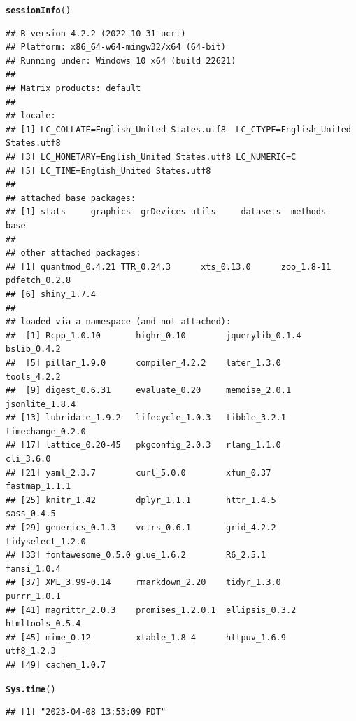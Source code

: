 \documentclass{article}\usepackage[]{graphicx}\usepackage[]{xcolor}
\makeatletter
\newcommand{\hlstd}[1]{\textcolor[rgb]{0.345,0.345,0.345}{#1}}%
\newcommand{\hlkwd}[1]{\textcolor[rgb]{0.737,0.353,0.396}{\textbf{#1}}}%
\newenvironment{kframe}{%
 \def\at@end@of@kframe{}%
 \ifinner\ifhmode%
  \def\at@end@of@kframe{\end{minipage}}%
  \begin{minipage}{\columnwidth}%
 \fi\fi%
 \def\FrameCommand##1{\hskip\@totalleftmargin \hskip-\fboxsep
 \colorbox{shadecolor}{##1}\hskip-\fboxsep
     \hskip-\linewidth \hskip-\@totalleftmargin \hskip\columnwidth}%
 \MakeFramed {\advance\hsize-\width
   \@totalleftmargin\z@ \linewidth\hsize
   \@setminipage}}%
 {\par\unskip\endMakeFramed%
 \at@end@of@kframe}
\newenvironment{knitrout}{}{} %
\makeatother
\begin{document}
\begin{knitrout}
\color{fgcolor}\begin{kframe}
\begin{alltt}
\hlkwd{sessionInfo}\hlstd{()}
\end{alltt}
\begin{verbatim}
## R version 4.2.2 (2022-10-31 ucrt)
## Platform: x86_64-w64-mingw32/x64 (64-bit)
## Running under: Windows 10 x64 (build 22621)
## 
## Matrix products: default
## 
## locale:
## [1] LC_COLLATE=English_United States.utf8  LC_CTYPE=English_United States.utf8   
## [3] LC_MONETARY=English_United States.utf8 LC_NUMERIC=C                          
## [5] LC_TIME=English_United States.utf8    
## 
## attached base packages:
## [1] stats     graphics  grDevices utils     datasets  methods   base     
## 
## other attached packages:
## [1] quantmod_0.4.21 TTR_0.24.3      xts_0.13.0      zoo_1.8-11      pdfetch_0.2.8  
## [6] shiny_1.7.4    
## 
## loaded via a namespace (and not attached):
##  [1] Rcpp_1.0.10       highr_0.10        jquerylib_0.1.4   bslib_0.4.2      
##  [5] pillar_1.9.0      compiler_4.2.2    later_1.3.0       tools_4.2.2      
##  [9] digest_0.6.31     evaluate_0.20     memoise_2.0.1     jsonlite_1.8.4   
## [13] lubridate_1.9.2   lifecycle_1.0.3   tibble_3.2.1      timechange_0.2.0 
## [17] lattice_0.20-45   pkgconfig_2.0.3   rlang_1.1.0       cli_3.6.0        
## [21] yaml_2.3.7        curl_5.0.0        xfun_0.37         fastmap_1.1.1    
## [25] knitr_1.42        dplyr_1.1.1       httr_1.4.5        sass_0.4.5       
## [29] generics_0.1.3    vctrs_0.6.1       grid_4.2.2        tidyselect_1.2.0 
## [33] fontawesome_0.5.0 glue_1.6.2        R6_2.5.1          fansi_1.0.4      
## [37] XML_3.99-0.14     rmarkdown_2.20    tidyr_1.3.0       purrr_1.0.1      
## [41] magrittr_2.0.3    promises_1.2.0.1  ellipsis_0.3.2    htmltools_0.5.4  
## [45] mime_0.12         xtable_1.8-4      httpuv_1.6.9      utf8_1.2.3       
## [49] cachem_1.0.7
\end{verbatim}
\begin{alltt}
\hlkwd{Sys.time}\hlstd{()}
\end{alltt}
\begin{verbatim}
## [1] "2023-04-08 13:53:09 PDT"
\end{verbatim}
\end{kframe}
\end{knitrout}
\end{document}
